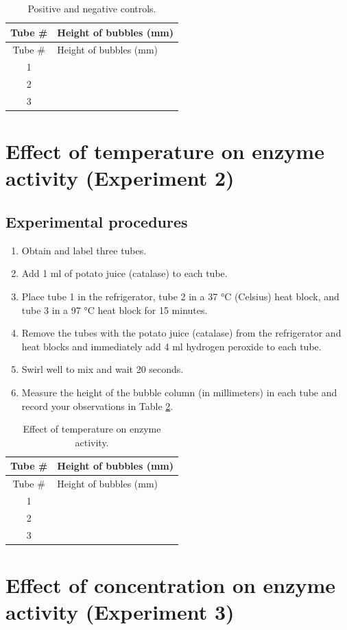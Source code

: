 \documentclass[]{book}
\providecommand{\tightlist}{%
  \setlength{\itemsep}{0pt}\setlength{\parskip}{0pt}}
\theoremstyle{definition}
\theoremstyle{definition}
\theoremstyle{definition}
\theoremstyle{remark}
\begin{document}
\begin{longtable}[]{@{}cl@{}}
\caption{\label{tab:control} Positive and negative controls.}\tabularnewline
\toprule
Tube \# & Height of bubbles (mm)\tabularnewline
\midrule
\endfirsthead
\toprule
Tube \# & Height of bubbles (mm)\tabularnewline
\midrule
\endhead
1 &\tabularnewline
2 &\tabularnewline
3 &\tabularnewline
\bottomrule
\end{longtable}

\section{Effect of temperature on enzyme activity (Experiment
2)}\label{effect-of-temperature-on-enzyme-activity-experiment-2}

\subsection{Experimental procedures}\label{experimental-procedures-21}

\begin{enumerate}
\def\labelenumi{\arabic{enumi}.}
\tightlist
\item
  Obtain and label three tubes.
\item
  Add 1 ml of potato juice (catalase) to each tube.
\item
  Place tube 1 in the refrigerator, tube 2 in a 37 °C (Celsius) heat
  block, and tube 3 in a 97 °C heat block for 15 minutes.
\item
  Remove the tubes with the potato juice (catalase) from the
  refrigerator and heat blocks and immediately add 4 ml hydrogen
  peroxide to each tube.
\item
  Swirl well to mix and wait 20 seconds.
\item
  Measure the height of the bubble column (in millimeters) in each tube
  and record your observations in Table \ref{tab:temp}.
\end{enumerate}

\begin{longtable}[]{@{}cl@{}}
\caption{\label{tab:temp} Effect of temperature on enzyme
activity.}\tabularnewline
\toprule
Tube \# & Height of bubbles (mm)\tabularnewline
\midrule
\endfirsthead
\toprule
Tube \# & Height of bubbles (mm)\tabularnewline
\midrule
\endhead
1 &\tabularnewline
2 &\tabularnewline
3 &\tabularnewline
\bottomrule
\end{longtable}

\section{Effect of concentration on enzyme activity (Experiment
3)}\label{effect-of-concentration-on-enzyme-activity-experiment-3}
\end{document}
